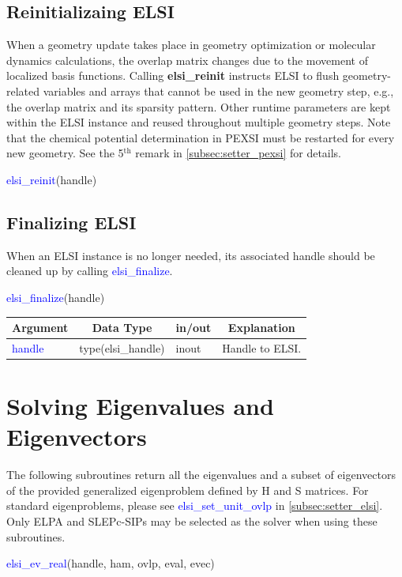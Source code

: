 \documentclass{report}
\begin{document}
\subsection{Reinitializaing ELSI}
\label{subsec:setup_reinit}
When a geometry update takes place in geometry optimization or molecular dynamics calculations, the overlap matrix changes due to the movement of localized basis functions.  Calling \textbf{elsi\_reinit} instructs ELSI to flush geometry-related variables and arrays that cannot be used in the new geometry step, e.g., the overlap matrix and its sparsity pattern.  Other runtime parameters are kept within the ELSI instance and reused throughout multiple geometry steps.  Note that the chemical potential determination in PEXSI must be restarted for every new geometry.  See the 5$^\text{th}$ remark in \ref{subsec:setter_pexsi} for details.
\begin{labeling}{\hspace{6cm}}
\item [\hspace{0.3cm} \textcolor{blue}{elsi\_reinit}(handle)]
\end{labeling}

\subsection{Finalizing ELSI}
\label{subsec:setup_final}
When an ELSI instance is no longer needed, its associated handle should be cleaned up by calling \textcolor{blue}{elsi\_finalize}.
\begin{labeling}{\hspace{6cm}}
\item [\hspace{0.3cm} \textcolor{blue}{elsi\_finalize}(handle)]
\end{labeling}

\begin{tabular}[]{|p{30mm}|p{30mm}|p{15mm}|p{90mm}|}
\hline
\multicolumn{1}{|c|}{\textbf{Argument}} & \multicolumn{1}{c|}{\textbf{Data Type}} & \multicolumn{1}{c|}{\textbf{in/out}} & \multicolumn{1}{c|}{\textbf{Explanation}}\\
\hline
\textcolor{blue}{handle} & type(elsi\_handle) & inout & Handle to ELSI.\\
\hline
\end{tabular}

\section{Solving Eigenvalues and Eigenvectors}
\label{sec:ev}
The following subroutines return all the eigenvalues and a subset of eigenvectors of the provided generalized eigenproblem defined by H and S matrices.  For standard eigenproblems, please see \textcolor{blue}{elsi\_set\_unit\_ovlp} in \ref{subsec:setter_elsi}.  Only ELPA and SLEPc-SIPs may be selected as the solver when using these subroutines.
\begin{labeling}{\hspace{6cm}}
\item [\hspace{0.3cm} \textcolor{blue}{elsi\_ev\_real}(handle, ham, ovlp, eval, evec)]
\end{labeling}
\end{document}
